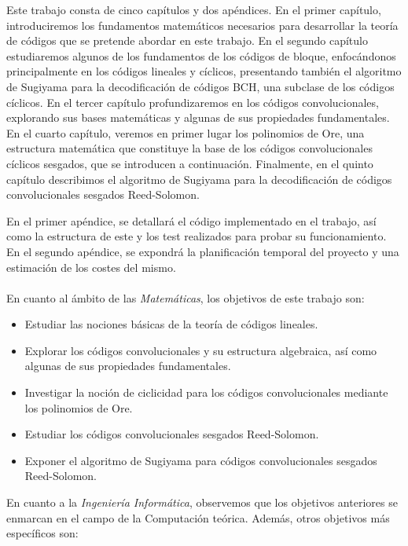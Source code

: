 Este trabajo consta de cinco capítulos y dos apéndices. En el primer capítulo, introduciremos los fundamentos matemáticos necesarios para desarrollar la teoría de códigos que se pretende abordar en este trabajo. En el segundo capítulo estudiaremos algunos de los fundamentos de los códigos de bloque, enfocándonos principalmente en los códigos lineales y cíclicos, presentando también el algoritmo de Sugiyama para la decodificación de códigos BCH, una subclase de los códigos cíclicos. En el tercer capítulo profundizaremos en los códigos convolucionales, explorando sus bases matemáticas y algunas de sus propiedades fundamentales. En el cuarto capítulo, veremos en primer lugar los polinomios de Ore, una estructura matemática que constituye la base de los códigos convolucionales cíclicos sesgados, que se introducen a continuación. Finalmente, en el quinto capítulo describimos el algoritmo de Sugiyama para la decodificación de códigos convolucionales sesgados Reed-Solomon.

En el primer apéndice, se detallará el código implementado en el trabajo, así como la estructura de este y los test realizados para probar su funcionamiento. En el segundo apéndice, se expondrá la planificación temporal del proyecto y una estimación de los costes del mismo.

\paragraph{}
\phantom{}

En cuanto al ámbito de las \emph{Matemáticas}, los objetivos de este trabajo son:

\begin{itemize}
    \item Estudiar las nociones básicas de la teoría de códigos lineales.
    \item Explorar los códigos convolucionales y su estructura algebraica, así como algunas de sus propiedades fundamentales.
    \item Investigar la noción de ciclicidad para los códigos convolucionales mediante los polinomios de Ore.
    \item Estudiar los códigos convolucionales sesgados Reed-Solomon.
    \item Exponer el algoritmo de Sugiyama para códigos convolucionales sesgados Reed-Solomon.
\end{itemize}

En cuanto a la \emph{Ingeniería Informática}, observemos que los objetivos anteriores se enmarcan en el campo de la Computación teórica. Además, otros objetivos más específicos son:

